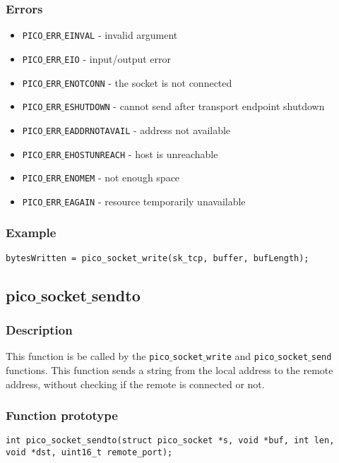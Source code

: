 \subsubsection*{Errors}
\begin{itemize}[noitemsep]
\item \texttt{PICO$\_$ERR$\_$EINVAL} - invalid argument
\item \texttt{PICO$\_$ERR$\_$EIO} - input/output error
\item \texttt{PICO$\_$ERR$\_$ENOTCONN} - the socket is not connected
\item \texttt{PICO$\_$ERR$\_$ESHUTDOWN} - cannot send after transport endpoint shutdown
\item \texttt{PICO$\_$ERR$\_$EADDRNOTAVAIL} - address not available
\item \texttt{PICO$\_$ERR$\_$EHOSTUNREACH} - host is unreachable
\item \texttt{PICO$\_$ERR$\_$ENOMEM} - not enough space
\item \texttt{PICO$\_$ERR$\_$EAGAIN} - resource temporarily unavailable
\end{itemize}

\subsubsection*{Example}
\begin{verbatim}
bytesWritten = pico_socket_write(sk_tcp, buffer, bufLength);
\end{verbatim}


\subsection{pico$\_$socket$\_$sendto}

\subsubsection*{Description}
This function is be called by the \texttt{pico$\_$socket$\_$write} and \texttt{pico$\_$socket$\_$send} functions.
This function sends a string from the local address to the remote address, without checking
if the remote is connected or not.

\subsubsection*{Function prototype}
\begin{verbatim}
int pico_socket_sendto(struct pico_socket *s, void *buf, int len,
void *dst, uint16_t remote_port);
\end{verbatim}

